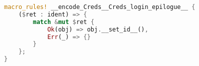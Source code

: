 \begin{minipage}{\linewidth}
\begin{lstlisting}[language=rust,caption={Return value inspecting macro},label={lst:retvalinsp}]
macro_rules! __encode_Creds__Creds_login_epilogue__ {
    ($ret : ident) => {
        match &mut $ret {
            Ok(obj) => obj.__set_id__(),
            Err(_) => {}
        }
    };
}
\end{lstlisting}
\end{minipage}

